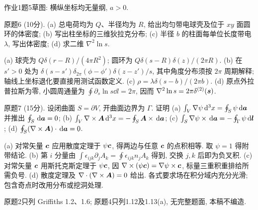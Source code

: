 \begin{center}
\par
作业1题5草图: 横纵坐标均无量纲, $a>0$.
\end{center}

\begin{exercise}
原题6 (10分). (a) 总电荷均为 $Q$、半径均为 $R$, 给出均匀带电球壳及位于 $xy$ 面圆环的体密度; (b) 写出柱坐标的三维狄拉克分布; (c) 半径 $b$ 的柱面每单位长度带电 $\lambda$, 写出体密度; (d) 求二维 $\nabla^2\ln s$.
\end{exercise}
\begin{solution}
(a) 球壳为 $Q\delta(r-R)/(4\pi R^2)$; 圆环为 $Q\delta(s-R)\delta(z)/(2\pi R)$. (b) 在 $s'>0$ 处为 $\delta(s-s')\delta_{2\pi}(\phi-\phi')\delta(z-z')/s$, 其中角度分布须按 $2\pi$ 周期解释; 轴线上坐标退化要直接用测试函数定义. (c) $\rho=\lambda\delta(s-b)/(2\pi b)$. (d) 原点外拉普拉斯为零, 小圆周通量为 $\oint\partial_s\ln s\dd l=2\pi$, 因而 $\nabla^2\ln s=2\pi\delta^{(2)}(\boldsymbol{s})$.
\end{solution}
\begin{exercise}
原题7 (15分). 设闭曲面 $S=\partial V$, 开曲面边界为 $\Gamma$. 证明 (a) $\int_V\nabla\psi\,\mathrm d^3x=\oint_S\psi\,\mathrm d\boldsymbol{a}$ 并推出 $\oint_S\,\mathrm d\boldsymbol{a}=0$; (b) $\int_V\nabla\times\boldsymbol{A}\,\mathrm d^3x=-\oint_S\boldsymbol{A}\times\,\mathrm d\boldsymbol{a}$; (c) $\int_S\nabla\psi\times\,\mathrm d\boldsymbol{a}=-\oint_\Gamma\psi\,\mathrm d\boldsymbol{l}$; (d) $\oint_S(\nabla\times\boldsymbol{A})\cdot\,\mathrm d\boldsymbol{a}=0$.
\end{exercise}
\begin{solution}
(a) 对常矢量 $\boldsymbol{c}$ 应用散度定理于 $\psi\boldsymbol{c}$, 得两边与任意 $\boldsymbol{c}$ 的点积相等. 取 $\psi=1$ 得附带结论. (b) 第 $i$ 分量由 $\int\epsilon_{ijk}\partial_jA_k=\oint\epsilon_{ijk}n_jA_k$ 得到, 交换 $j,k$ 后即为负叉积. (c) 对常矢量 $\boldsymbol{c}$ 用斯托克斯定理于 $\psi\boldsymbol{c}$, 因 $\nabla\times(\psi\boldsymbol{c})=\nabla\psi\times\boldsymbol{c}$, 标量三重积重排给所需负号. (d) 散度定理及 $\nabla\cdot(\nabla\times\boldsymbol{A})=0$ 给出. 各式要求场在积分域内充分光滑; 包含奇点时改用分布或挖洞处理.
\end{solution}
原题2只列 Griffiths 1.2、1.6; 原题4只列1.12及1.13(a), 无完整题面, 本稿不编造.

